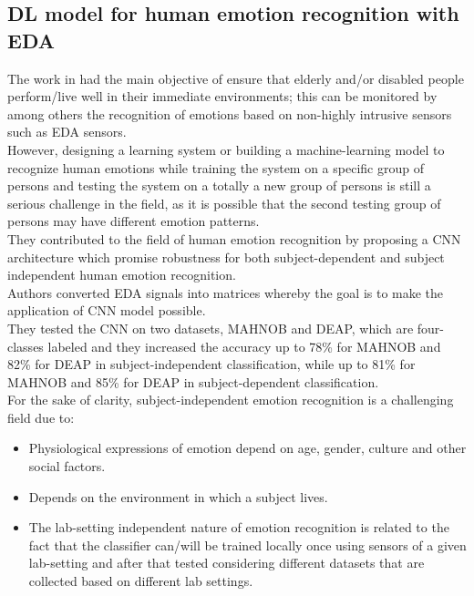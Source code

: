 \subsection{DL model for human emotion recognition with EDA}
The work in \cite{al2019deep} had the main objective of ensure that elderly and/or disabled people perform/live well in their immediate environments; this can be monitored by among others the recognition of emotions based on non-highly intrusive sensors such as EDA sensors.
\\
However, designing a learning system or building a machine-learning model to recognize human emotions while training the system on a specific group of persons and testing the system on a totally a new group of persons is still a serious challenge in the field, as it is possible that the second testing group of persons may have different emotion patterns.
\\ \indent
They contributed to the field of human emotion recognition by proposing a CNN architecture which promise robustness for both subject-dependent and subject independent human emotion recognition.
\\
Authors converted EDA signals into matrices whereby the goal is to make the application of CNN model possible.
\\
They tested the CNN on two datasets, MAHNOB and DEAP, which are four-classes labeled and they increased the accuracy up to 78\% for MAHNOB and 82\% for DEAP in subject-independent classification, while up to 81\% for MAHNOB and 85\% for DEAP in subject-dependent classification.
\\ \indent
For the sake of clarity, subject-independent emotion recognition is a challenging field due to:
\begin{itemize}
	\item Physiological expressions of emotion depend on age, gender, culture and other social factors.
	\item Depends on the environment in which a subject lives.
	\item The lab-setting independent nature of emotion recognition is related to the fact that the classifier can/will be trained locally once using sensors of a given lab-setting and after that tested considering different datasets that are collected based on different lab settings. 
\end{itemize}